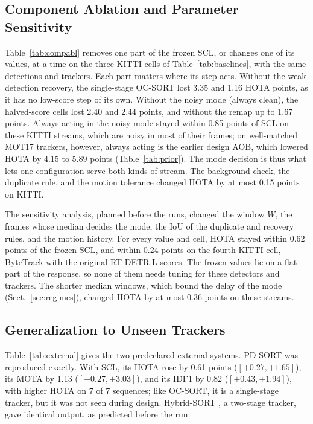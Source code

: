 \documentclass[pdflatex,sn-mathphys-num,iicol]{sn-jnl}
\newcommand{\scl}{SCL}
\newcommand{\aob}{AOB}
\begin{document}
\subsection{Component Ablation and Parameter Sensitivity}\label{sec:ablation}
Table~\ref{tab:compabl} removes one part of the frozen \scl{}, or changes one of its values, at a
time on the three KITTI cells of Table~\ref{tab:baselines}, with the same detections and trackers.
Each part matters where its step acts. Without the weak detection recovery, the single-stage
OC-SORT lost 3.35 and 1.16 HOTA points, as it has no low-score step of its own. Without the noisy
mode (always clean), the halved-score cells lost 2.40 and 2.44 points, and without the remap up to
1.67 points. Always acting in the noisy mode stayed within 0.85 points of \scl{} on these KITTI
streams, which are noisy in most of their frames; on well-matched MOT17 trackers, however, always
acting is the earlier design \aob{}, which lowered HOTA by 4.15 to 5.89 points
(Table~\ref{tab:prior}). The mode decision is thus what lets one configuration serve both kinds of
stream. The background check, the duplicate rule, and the motion tolerance changed HOTA by at most
0.15 points on KITTI.

The sensitivity analysis, planned before the runs, changed the window $W$, the frames whose median
decides the mode, the IoU of the duplicate and recovery rules, and the motion history. For every
value and cell, HOTA stayed within 0.62 points of the frozen \scl{}, and within 0.24 points on the
fourth KITTI cell, ByteTrack with the original RT-DETR-L scores. The frozen values lie on a flat
part of the response, so none of them needs tuning for these detectors and trackers. The shorter
median windows, which bound the delay of the mode (Sect.~\ref{sec:regimes}), changed HOTA by at most
0.36 points on these streams.


\subsection{Generalization to Unseen Trackers}\label{sec:external}
Table~\ref{tab:external} gives the two predeclared external systems. PD-SORT \cite{wang2025pdsort}
was reproduced exactly. With \scl{}, its HOTA rose by 0.61 points ($[+0.27,+1.65]$), its MOTA by
1.13 ($[+0.27,+3.03]$), and its IDF1 by 0.82 ($[+0.43,+1.94]$), with higher HOTA on 7 of 7
sequences; like OC-SORT, it is a single-stage tracker, but it was not seen during design.
Hybrid-SORT \cite{yang2024hybridsort}, a two-stage tracker, gave identical output, as predicted
before the run.
\end{document}
